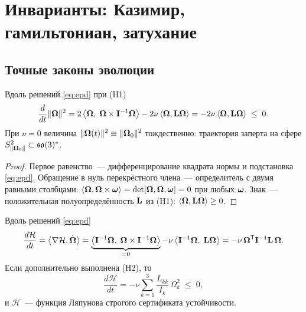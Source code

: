 \needspace{0.25\textheight}
\section{Инварианты: Казимир, гамильтониан, затухание}\label{sec:inv}

\subsection{Точные законы эволюции}

\begin{theorem}[Казимир]\label{th:casimir}
Вдоль решений \eqref{eq:epd} при \textup{(H1)}
\begin{equation}\label{eq:casimir}
  \frac{d}{dt}\|\boldsymbol{\Omega}\|^2
  = 2\,\bigl\langle \boldsymbol{\Omega},\; \boldsymbol{\Omega}\times\mathbf{I}^{-1}\boldsymbol{\Omega}\bigr\rangle
    - 2\nu\,\langle\boldsymbol{\Omega},\mathbf{L}\boldsymbol{\Omega}\rangle
  = -2\nu\,\langle\boldsymbol{\Omega},\mathbf{L}\boldsymbol{\Omega}\rangle \;\le\; 0 .
\end{equation}
При $\nu = 0$ величина $\|\boldsymbol{\Omega}(t)\|^2 \equiv \|\boldsymbol{\Omega}_0\|^2$ тождественно:
траектория заперта на сфере $S^2_{\|\boldsymbol{\Omega}_0\|} \subset \mathfrak{so}(3)^{*}$.
\end{theorem}

\begin{proof}
Первое равенство~--- дифференцирование квадрата нормы и подстановка
\eqref{eq:epd}. Обращение в нуль перекрёстного члена~--- определитель
с двумя равными столбцами:
$\langle\boldsymbol{\Omega}, \boldsymbol{\Omega}\times\boldsymbol{\omega}\rangle = \det[\boldsymbol{\Omega},\boldsymbol{\Omega},\boldsymbol{\omega}] = 0$
при любых $\boldsymbol{\omega}$. Знак~--- положительная полуопределённость $\mathbf{L}$
из \textup{(H1)}: $\langle\boldsymbol{\Omega},\mathbf{L}\boldsymbol{\Omega}\rangle \ge 0$.
\end{proof}

\begin{theorem}[гамильтониан]\label{th:ham}
Вдоль решений \eqref{eq:epd}
\begin{equation}\label{eq:ham}
  \frac{d\mathcal H}{dt}
  = \bigl\langle \nabla\mathcal H,\dot{\boldsymbol{\Omega}}\bigr\rangle
  = \underbrace{\bigl\langle \mathbf{I}^{-1}\boldsymbol{\Omega},\;\boldsymbol{\Omega}\times\mathbf{I}^{-1}\boldsymbol{\Omega}\bigr\rangle}_{=0}
  - \nu\,\bigl\langle \mathbf{I}^{-1}\boldsymbol{\Omega},\;\mathbf{L}\boldsymbol{\Omega}\bigr\rangle
  = -\nu\,\boldsymbol{\Omega}^{\mathsf T}\mathbf{I}^{-1}\mathbf{L}\,\boldsymbol{\Omega} .
\end{equation}
Если дополнительно выполнена \textup{(H2)}, то
\begin{equation}\label{eq:ham-diag}
  \frac{d\mathcal H}{dt} = -\nu\sum_{k=1}^{3}\frac{L_{kk}}{I_k}\,\Omega_k^2 \;\le\; 0 ,
\end{equation}
и $\mathcal H$~--- функция Ляпунова строгого сертификата устойчивости.
\end{theorem}

